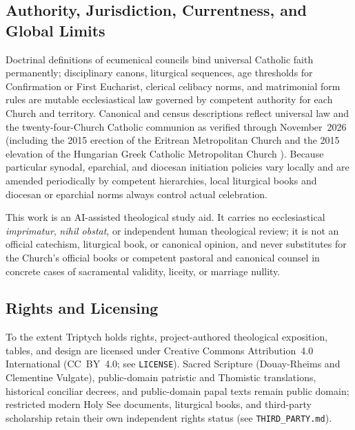 \subsection{Authority, Jurisdiction, Currentness, and Global Limits}
\label{subsec:scope-limits}

Doctrinal definitions of ecumenical councils bind universal Catholic faith permanently; disciplinary canons, liturgical sequences, age thresholds for Confirmation or First Eucharist, clerical celibacy norms, and matrimonial form rules are mutable ecclesiastical law governed by competent authority for each Church  and territory. Canonical and census descriptions reflect universal law and the twenty-four-Church Catholic communion as verified through November~2026 (including the 2015 erection of the Eritrean Metropolitan Church  and the 2015 elevation of the Hungarian Greek Catholic Metropolitan Church ). Because particular synodal, eparchial, and diocesan initiation policies vary locally and are amended periodically by competent hierarchies, local liturgical books and diocesan or eparchial norms always control actual celebration.

This work is an AI-assisted theological study aid. It carries no ecclesiastical \emph{imprimatur}, \emph{nihil obstat}, or independent human theological review; it is not an official catechism, liturgical book, or canonical opinion, and never substitutes for the Church's official books or competent pastoral and canonical counsel in concrete cases of sacramental validity, liceity, or marriage nullity.

\subsection{Rights and Licensing}
\label{subsec:scope-rights}

To the extent Triptych holds rights, project-authored theological exposition, tables, and design are licensed under Creative Commons Attribution~4.0 International (CC~BY~4.0; see \texttt{LICENSE}). Sacred Scripture (Douay-Rheims and Clementine Vulgate), public-domain patristic and Thomistic translations, historical conciliar decrees, and public-domain papal texts remain public domain; restricted modern Holy See documents, liturgical books, and third-party scholarship retain their own independent rights status (see \texttt{THIRD\_PARTY.md}).


